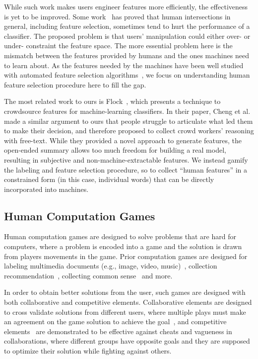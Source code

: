 \documentclass[chi_draft]{sigchi}
\begin{document}
While such work makes users engineer features more efficiently, the effectiveness is yet to be improved.
Some work~\cite{fiebrink2011human,stumpf2009interacting, patel2008investigating} has proved that human intersections in general, including feature selection, sometimes tend to hurt the performance of a classifier. 
The proposed problem is that users' manipulation could either over- or under- constraint the feature space.
The more essential problem here is the mismatch between the features provided by humans and the ones machines need to learn about. 
As the features needed by the machines have been well studied with automated feature selection algorithms~\cite{empirical}, we focus on understanding human feature selection procedure here to fill the gap. 

The most related work to ours is Flock~\cite{cheng2015flock}, which presents a technique to crowdsource features for machine-learning classifiers.
In their paper, Cheng et al. made a similar argument to ours that people struggle to articulate what led them to make their decision, and therefore proposed to collect crowd workers' reasoning with free-text.
While they provided a novel approach to generate features, the open-ended summary allows too much freedom for building a real model, resulting in subjective and non-machine-extractable features.
We instead gamify the labeling and feature selection procedure, so to collect ``human features'' in a constrained form (in this case, individual words) that can be directly incorporated into machines.


\subsection{Human Computation Games}
Human computation games are designed to solve problems that are hard for computers, where a problem is encoded into a game and the solution is drawn from players movements in the game. Prior computation games are designed for labeling multimedia documents (e.g., image, video, music)~\cite{vonAhn:2004:LIC:985692.985733,ho2009kisskissban,vonAhn:2006:PGL:1124772.1124782,Seneviratne:2010:IFI:1743384.1743473,law2007tagatune}, collection recommendation~\cite{walsh2010curator}, collecting common sense~\cite{von2006verbosity} and more. 

In order to obtain better solutions from the user, such games are designed with both collaborative and competitive elements. Collaborative elements are designed to cross validate solutions from different users, where multiple plays must make an agreement on the game solution to achieve the goal~\cite{vonAhn:2006:PGL:1124772.1124782}, and competitive elements~\cite{ho2009kisskissban} are demonstrated to be effective against cheats and vagueness in collaborations, where different groups have opposite goals and they are supposed to optimize their solution while fighting against others.
\end{document}
